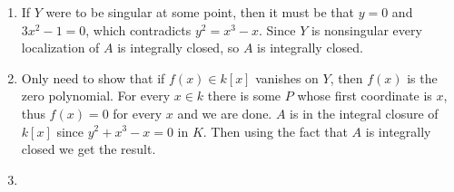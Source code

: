 \documentclass{note}
\begin{document}
\begin{enumerate}
\item If $Y$ were to be singular at some point, then it must be that
  $y = 0$ and $3x^2-1 = 0$, which contradicts $y^2 = x^3 - x$. Since
  $Y$ is nonsingular every localization of $A$ is integrally closed,
  so $A$ is integrally closed.
\item Only need to show that if $f(x) \in k[x]$ vanishes on $Y$, then
  $f(x)$ is the zero polynomial. For every $x\in k$ there is some $P$
  whose first coordinate is $x$, thus $f(x) = 0$ for every $x$ and we
  are done. $A$ is in the integral closure of $k[x]$ since
  $y^2 + x^3 - x = 0$ in $K$. Then using the fact that $A$ is
  integrally closed we get the result.
\item 
\end{enumerate}
\end{document}
